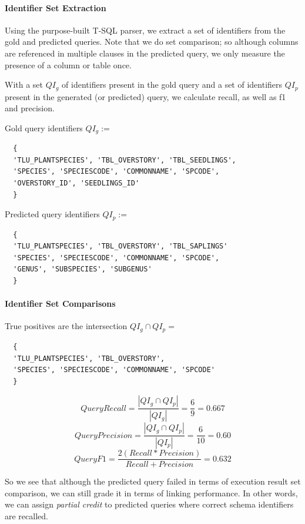 \paragraph{Identifier Set Extraction}
Using the purpose-built T-SQL parser, we extract a set of identifiers from the gold and predicted queries.
Note that we do set comparison; so although columns are referenced in multiple clauses in the predicted query, we only measure the presence of a column or table once.

With a set $QI_g$ of identifiers present in the gold query and a set of identifiers $QI_p$ present in the generated (or predicted) query, we calculate recall, as well as f1 and precision.

Gold query identifiers $QI_g :=$ 
  \begin{verbatim}
  {
  'TLU_PLANTSPECIES', 'TBL_OVERSTORY', 'TBL_SEEDLINGS',
  'SPECIES', 'SPECIESCODE', 'COMMONNAME', 'SPCODE',
  'OVERSTORY_ID', 'SEEDLINGS_ID'
  }
\end{verbatim}

Predicted query identifiers $QI_p :=$ 
\begin{verbatim}
  {
  'TLU_PLANTSPECIES', 'TBL_OVERSTORY', 'TBL_SAPLINGS'
  'SPECIES', 'SPECIESCODE', 'COMMONNAME', 'SPCODE',
  'GENUS', 'SUBSPECIES', 'SUBGENUS'
  }
\end{verbatim}

\paragraph{Identifier Set Comparisons}

True positives are the intersection $QI_g \cap QI_p =$
\begin{verbatim}
  {
  'TLU_PLANTSPECIES', 'TBL_OVERSTORY',
  'SPECIES', 'SPECIESCODE', 'COMMONNAME', 'SPCODE'
  }
\end{verbatim}

$$QueryRecall = \frac{|QI_g \cap QI_p|}{|QI_g|} = \frac{6}{9} = 0.667$$
$$QueryPrecision = \frac{|QI_g \cap QI_p|}{|QI_p|} = \frac{6}{10} = 0.60$$
$$QueryF1 = \frac{2(Recall*Precision)}{Recall+Precision} = 0.632$$

So we see that although the predicted query failed in terms of execution result set comparison, we can still grade it in terms of linking performance.
In other words, we can assign \emph{partial credit} to predicted queries where correct schema identifiers are recalled.






